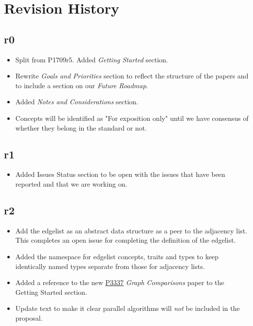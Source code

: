 \section{Revision History}

\subsection*{\paperno r0}

\begin{itemize}
      \item Split from P1709r5. Added \textit{Getting Started} section.
      \item Rewrite \textit{Goals and Priorities} section to reflect the structure of the papers and to include a section on our \textit{Future Roadmap}.
      \item Added \textit{Notes and Considerations} section.
      \item Concepts will be identified as "For exposition only" until we have consensus of whether they belong in the standard or not.
\end{itemize}

\subsection*{\paperno r1}
\begin{itemize}
      \item {Added Issues Status section to be open with the issues that have been reported and that we are working on.}
\end{itemize}

\subsection*{\paperno r2}
\begin{itemize}
      \item Add the edgelist as an abstract data structure as a peer to the adjacency list. 
            This completes an open issue for completing the definition of the edgelist.
      \item Added the  namespace for edgelist concepts, traits and types
            to keep identically named types separate from those for adjacency lists.
      \item Added a reference to the new \href{https://www.wg21.link/P3337}{P3337} \textit{Graph Comparisons} paper
            to the Getting Started section.
      \item Update text to make it clear parallel algorithms will \textit{not} be included in the proposal.
\end{itemize}

